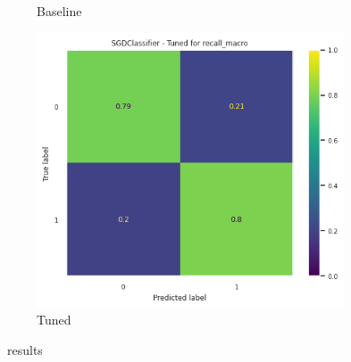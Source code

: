 \begin{frame}{\subsecname}
\begin{figure}
\begin{subfigure}[c]{0.4\textwidth}
        \caption{Baseline}
    \end{subfigure}
    \begin{subfigure}[c]{0.4\textwidth}
        \includegraphics[width=\textwidth]{images/models/SGD_tuned.png}
        \caption{Tuned}
    \end{subfigure}
    \caption{\subsecname\ results}
\end{figure}
\end{frame}
